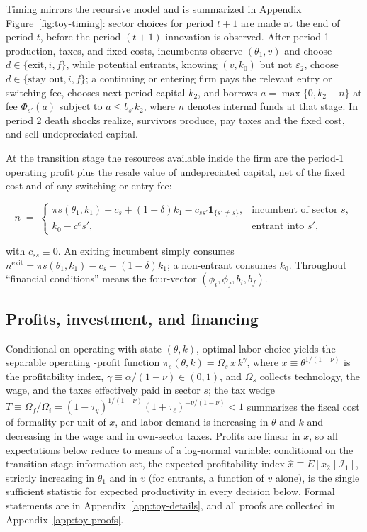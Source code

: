 \documentclass[12pt]{article}
\begin{document}
Timing mirrors the recursive model and is summarized in Appendix Figure~\ref{fig:toy-timing}: sector choices for period $t+1$ are made at the end of period $t$, before the period-$(t+1)$ innovation is observed. After period-1 production, taxes, and fixed costs, incumbents observe $(\theta_1, v)$ and choose $d \in \{\text{exit}, i, f\}$, while potential entrants, knowing $(v, k_0)$ but not $\varepsilon_2$, choose $d \in \{\text{stay out}, i, f\}$; a continuing or entering firm pays the relevant entry or switching fee, chooses next-period capital $k_2$, and borrows $a = \max\{0, k_2 - n\}$ at fee $\Phi_{s'}(a)$ subject to $a \le b_{s'} k_2$, where $n$ denotes internal funds at that stage. In period 2 death shocks realize, survivors produce, pay taxes and the fixed cost, and sell undepreciated capital.
 
At the transition stage the resources available inside the firm are the period-1 operating profit plus the resale value of undepreciated capital, net of the fixed cost and of any switching or entry fee:

\begin{equation}
  n \;=\;
  \begin{cases}
    \pi{s}(\theta_{1},k_{1}) - c_{s} + (1-\delta)k_{1}
      - c_{ss'}\mathbf{1}_{\{s'\neq s\}},
      & \text{incumbent of sector } s,\\[2pt]
    k_{0} - c^e{s'}, & \text{entrant into } s' ,
  \end{cases}
  \label{eq:toy-n}
\end{equation}

with $c_{ss}\equiv 0$. An exiting incumbent simply consumes $n^{\text{exit}}=\pi{s}(\theta_{1},k_{1})-c_{s}+(1-\delta)k_{1}$; a non-entrant consumes $k_{0}$. Throughout ``financial conditions'' means the four-vector $(\phi_{i},\phi_{f},b_{i},b_{f})$.
 
\subsection{Profits, investment, and financing}
\label{sec:toy-invest}

Conditional on operating with state $(\theta, k)$, optimal labor choice yields the separable operating -profit function $\pi_s(\theta, k) = \Omega_s\, x\, k^{\gamma}$, where $x \equiv \theta^{1/(1-\nu)}$ is the profitability index, $\gamma \equiv \alpha/(1-\nu) \in (0,1)$, and $\Omega_s$ collects technology, the wage, and the taxes effectively paid in sector $s$; the tax wedge $T \equiv \Omega_f/\Omega_i = (1-\tau_y)^{1/(1-\nu)}(1+\tau_\ell)^{-\nu/(1-\nu)} < 1$ summarizes the fiscal cost of formality per unit of $x$, and labor demand is increasing in $\theta$ and $k$ and decreasing in the wage and in own-sector taxes. Profits are linear in $x$, so all expectations below reduce to means of a log-normal variable: conditional on the transition-stage information set, the expected profitability index $\hat{x} \equiv E[x_2 \mid \mathcal{I}_1]$, strictly increasing in $\theta_1$ and in $v$ (for entrants, a function of $v$ alone), is the single sufficient statistic for expected productivity in every decision below. Formal statements are in Appendix~\ref{app:toy-details}, and all proofs are collected in Appendix~\ref{app:toy-proofs}.
 
\end{document}
